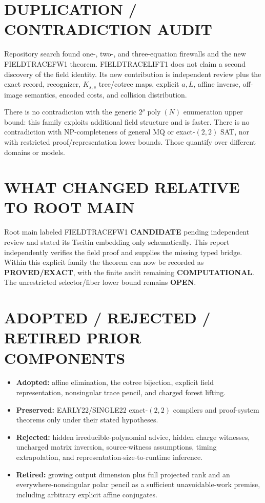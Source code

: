 \documentclass[11pt]{article}
\newcommand{\EXACT}{\textbf{PROVED/EXACT}}
\newcommand{\COMP}{\textbf{COMPUTATIONAL}}
\newcommand{\CAND}{\textbf{CANDIDATE}}
\newcommand{\OPEN}{\textbf{OPEN}}
\begin{document}
\section{DUPLICATION / CONTRADICTION AUDIT}
Repository search found one-, two-, and three-equation firewalls and the new
FIELDTRACEFW1 theorem.  FIELDTRACELIFT1 does not claim a second discovery of
the field identity.  Its new contribution is independent review plus the
exact record, recognizer, $K_{s,s}$ tree/cotree maps, explicit $a,L$, affine
inverse, off-image semantics, encoded costs, and collision distribution.

There is no contradiction with the generic
$2^\rho\operatorname{poly}(N)$ enumeration upper bound: this family exploits
additional field structure and is faster.  There is no contradiction with
NP-completeness of general MQ or exact-$(2,2)$ SAT, nor with restricted
proof/representation lower bounds.  Those quantify over different domains or
models.

\section{WHAT CHANGED RELATIVE TO ROOT MAIN}
Root main labeled FIELDTRACEFW1 \CAND{} pending independent review and stated
its Tseitin embedding only schematically.  This report independently verifies
the field proof and supplies the missing typed bridge.  Within this explicit
family the theorem can now be recorded as \EXACT{}, with the finite audit
remaining \COMP{}.  The unrestricted selector/fiber lower bound remains
\OPEN{}.

\section{ADOPTED / REJECTED / RETIRED PRIOR COMPONENTS}
\begin{itemize}
\item \textbf{Adopted:} affine elimination, the cotree bijection, explicit
field representation, nonsingular trace pencil, and charged forest lifting.
\item \textbf{Preserved:} EARLY22/SINGLE22 exact-$(2,2)$ compilers and
proof-system theorems only under their stated hypotheses.
\item \textbf{Rejected:} hidden irreducible-polynomial advice, hidden charge
witnesses, uncharged matrix inversion, source-witness assumptions, timing
extrapolation, and representation-size-to-runtime inference.
\item \textbf{Retired:} growing output dimension plus full projected rank and
an everywhere-nonsingular polar pencil as a sufficient unavoidable-work
premise, including arbitrary explicit affine conjugates.
\end{itemize}
\end{document}
